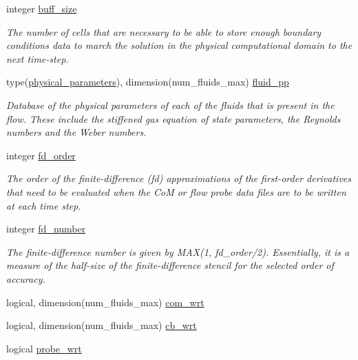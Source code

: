 \begin{DoxyCompactItemize}
integer \hyperlink{namespacem__global__parameters_a6e342ae3eb66f89e0eeb94e11aa42d92}{buff\+\_\+size}
\begin{DoxyCompactList}\small\item\em The number of cells that are necessary to be able to store enough boundary conditions data to march the solution in the physical computational domain to the next time-\/step. \end{DoxyCompactList}\item 
type(\hyperlink{structm__derived__types_1_1physical__parameters}{physical\+\_\+parameters}), dimension(num\+\_\+fluids\+\_\+max) \hyperlink{namespacem__global__parameters_a7297abec8863ecabf95e24ebdae46a17}{fluid\+\_\+pp}
\begin{DoxyCompactList}\small\item\em Database of the physical parameters of each of the fluids that is present in the flow. These include the stiffened gas equation of state parameters, the Reynolds numbers and the Weber numbers. \end{DoxyCompactList}\item 
integer \hyperlink{namespacem__global__parameters_a8892cc67c7d04be4d8e6d02a86e209bc}{fd\+\_\+order}
\begin{DoxyCompactList}\small\item\em The order of the finite-\/difference (fd) approximations of the first-\/order derivatives that need to be evaluated when the CoM or flow probe data files are to be written at each time step. \end{DoxyCompactList}\item 
integer \hyperlink{namespacem__global__parameters_a60d7ab72fdab2b005144a5a45aa572de}{fd\+\_\+number}
\begin{DoxyCompactList}\small\item\em The finite-\/difference number is given by M\+AX(1, fd\+\_\+order/2). Essentially, it is a measure of the half-\/size of the finite-\/difference stencil for the selected order of accuracy. \end{DoxyCompactList}\item 
logical, dimension(num\+\_\+fluids\+\_\+max) \hyperlink{namespacem__global__parameters_a36d8d56515556bc34bc0c88da60f6b62}{com\+\_\+wrt}
\item 
logical, dimension(num\+\_\+fluids\+\_\+max) \hyperlink{namespacem__global__parameters_a2ed9e718df8c2a250e5d8cce2e04cbb7}{cb\+\_\+wrt}
\item 
logical \hyperlink{namespacem__global__parameters_a2de4a56202a6e2f47ce657fcda4ecdb4}{probe\+\_\+wrt}

\end{DoxyCompactItemize}
